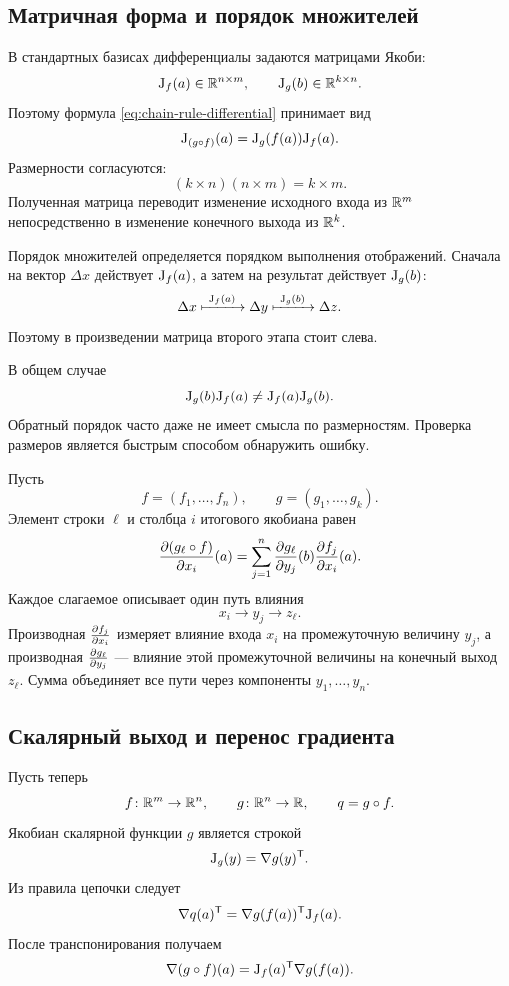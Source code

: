 \subsection{Матричная форма и порядок множителей}

В стандартных базисах дифференциалы задаются матрицами Якоби:
\[
\mathrm{J}_{f}(a)\in\mathbb{R}^{n\times m},
\qquad
\mathrm{J}_{g}(b)\in\mathbb{R}^{k\times n}.
\]
Поэтому формула \eqref{eq:chain-rule-differential} принимает вид
\begin{equation}
\mathrm{J}_{(g\circ f)}(a)
=
\mathrm{J}_{g}(f(a))\mathrm{J}_{f}(a).
\label{eq:chain-rule-jacobian}
\end{equation}
Размерности согласуются:
\[
(k\times n)(n\times m)=k\times m.
\]
Полученная матрица переводит изменение исходного входа из \(\mathbb{R}^m\) непосредственно в изменение конечного выхода из \(\mathbb{R}^k\).

Порядок множителей определяется порядком выполнения отображений. Сначала на вектор \(\Delta x\) действует \(\mathrm{J}_{f}(a)\), а затем на результат действует \(\mathrm{J}_{g}(b)\):
\[
\Delta x
\xmapsto{\  \mathrm{J}_{f} (a)\ }
\Delta y
\xmapsto{\  \mathrm{J}_{g} (b)\ }
\Delta z.
\]
Поэтому в произведении матрица второго этапа стоит слева.

\begin{caution}
В общем случае
\[
\mathrm{J}_{g}(b)\mathrm{J}_{f}(a)
\neq
\mathrm{J}_{f}(a)\mathrm{J}_{g}(b).
\]
Обратный порядок часто даже не имеет смысла по размерностям. Проверка размеров является быстрым способом обнаружить ошибку.
\end{caution}

Пусть
\[
f=(f_1,\dots,f_n),
\qquad
g=(g_1,\dots,g_k).
\]
Элемент строки \(\ell\) и столбца \(i\) итогового якобиана равен
\begin{equation}
\frac{\partial (g_\ell\circ f)}{\partial x_i}(a)
=
\sum_{j=1}^{n}
\frac{\partial g_\ell}{\partial y_j}(b)
\frac{\partial f_j}{\partial x_i}(a).
\label{eq:chain-rule-coordinate}
\end{equation}
Каждое слагаемое описывает один путь влияния
\[
x_i\longrightarrow y_j\longrightarrow z_\ell.
\]
Производная \(\frac{\partial f_j}{\partial x_i}\) измеряет влияние входа \(x_i\) на промежуточную величину \(y_j\), а производная \(\frac{\partial g_\ell}{\partial y_j}\) --- влияние этой промежуточной величины на конечный выход \(z_\ell\). Сумма объединяет все пути через компоненты \(y_1,\dots,y_n\).

\subsection{Скалярный выход и перенос градиента}

Пусть теперь
\[
f\colon\mathbb{R}^m\to\mathbb{R}^n,
\qquad
g\colon\mathbb{R}^n\to\mathbb{R},
\qquad
q=g\circ f.
\]
Якобиан скалярной функции \(g\) является строкой
\[
\mathrm{J}_{g}(y)=\nabla g(y)^{\mathsf{T}}.
\]
Из правила цепочки следует
\[
\nabla q(a)^{\mathsf{T}}
=
\nabla g(f(a))^{\mathsf{T}}\mathrm{J}_{f}(a).
\]
После транспонирования получаем
\begin{equation}
\nabla(g\circ f)(a)
=
\mathrm{J}_{f}(a)^{\mathsf{T}}\nabla g(f(a)).
\label{eq:gradient-chain-rule}
\end{equation}

